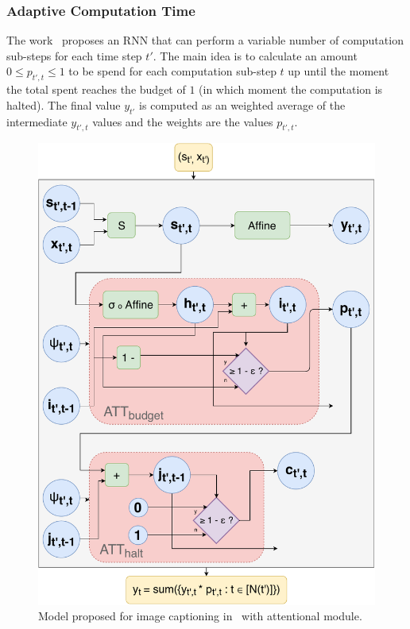 \documentclass[12pt]{article}
\begin{document}
\subsubsection{Adaptive Computation Time}
The work~\cite{ref:act} proposes an RNN that can perform a variable number of computation sub-steps for each time step $t'$.
The main idea is to calculate an amount $0 \le p_{t',t} \le 1$ to be spend for each computation sub-step $t$ up until the
moment the total spent reaches the budget of $1$ (in which moment the computation is halted).
The final value $y_{t'}$ is computed as an weighted average of the intermediate $y_{t',t}$ values and the weights are the values
$p_{t',t}$.

\begin{figure}[H]
    \centering
    \includegraphics[width=0.6\linewidth]{./img/act.pdf}
    \caption{Model proposed for image captioning in~\cite{ref:act} with attentional module.}
\label{fig:act}
\end{figure}
\end{document}
